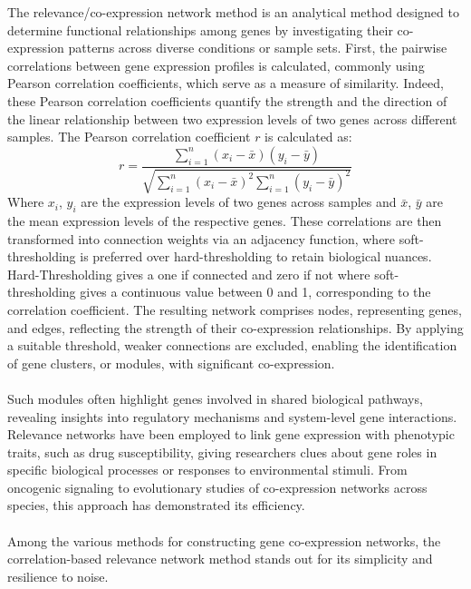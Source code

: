 The relevance/co-expression network method is an analytical method designed to determine functional relationships among genes by investigating their co-expression patterns across diverse conditions or sample sets.
First, the pairwise correlations between gene expression profiles is calculated, commonly using Pearson correlation coefficients, which serve as a measure of similarity\cite{zhang_general_2005}.
Indeed, these Pearson correlation coefficients quantify the strength and the direction of the linear relationship between two expression levels of two genes across different samples.
The Pearson correlation coefficient $r$ is calculated as:
\[r = \frac{\sum_{i=1}^{n} (x_i - \bar{x})(y_i - \bar{y})}{\sqrt{\sum_{i=1}^{n} (x_i - \bar{x})^2 \sum_{i=1}^{n} (y_i - \bar{y})^2}}\]
Where $x_i$, $y_i$ are the expression levels of two genes across samples and $\bar{x}$, $\bar{y}$ are the mean expression levels of the respective genes.
These correlations are then transformed into connection weights via an adjacency function, where soft-thresholding is preferred over hard-thresholding to retain biological nuances\cite{butte_discovering_2000, oldham_conservation_2006}.
Hard-Thresholding gives a one if connected and zero if not where soft-thresholding gives a continuous value between 0 and 1, corresponding to the correlation coefficient.
The resulting network comprises nodes, representing genes, and edges, reflecting the strength of their co-expression relationships.
By applying a suitable threshold, weaker connections are excluded, enabling the identification of gene clusters, or modules, with significant co-expression\cite{schmitt_elucidation_2004}.
\\\\
Such modules often highlight genes involved in shared biological pathways, revealing insights into regulatory mechanisms and system-level gene interactions\cite{horvath_analysis_2006}.
Relevance networks have been employed to link gene expression with phenotypic traits, such as drug susceptibility, giving researchers clues about gene roles in specific biological processes or responses to environmental stimuli\cite{butte_discovering_2000}.
From oncogenic signaling to evolutionary studies of co-expression networks across species, this approach has demonstrated its efficiency\cite{oldham_conservation_2006}.
\\\\
Among the various methods for constructing gene co-expression networks, the correlation-based relevance network method stands out for its simplicity and resilience to noise\cite{butte_discovering_2000}.
